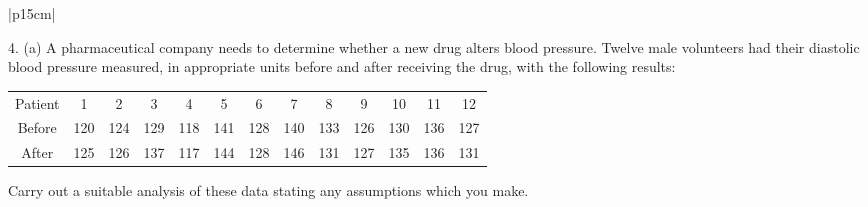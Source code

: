 \documentclass[a4paper,12pt]{article}
\begin{document}
\begin{table}[ht!]
 
\centering
 
\begin{tabular}{|p{15cm}|}
 
\hline  

4. (a) A pharmaceutical company needs to determine whether a new drug alters blood pressure.  
Twelve male volunteers had their diastolic blood pressure measured, in appropriate units before and after receiving the drug, with the following results:

\begin{center}
\begin{tabular}{c|c|c|c|c|c|c|c|c|c|c|c|c|}
Patient & 1&  2&  3 & 4 & 5& 6& 7& 8& 9& 10& 11& 12\\
Before&  120 & 124 & 129 & 118 & 141& 128& 140& 133& 126& 130& 136& 127 \\
After & 125&  126& 137& 117& 144 &128 &146& 131& 127 &135& 136& 131\\

\end{tabular}
\end{center}
 Carry out a suitable analysis of these data stating any assumptions which you make.

\\ \hline
  
\end{tabular}

\end{table}
\end{document}
